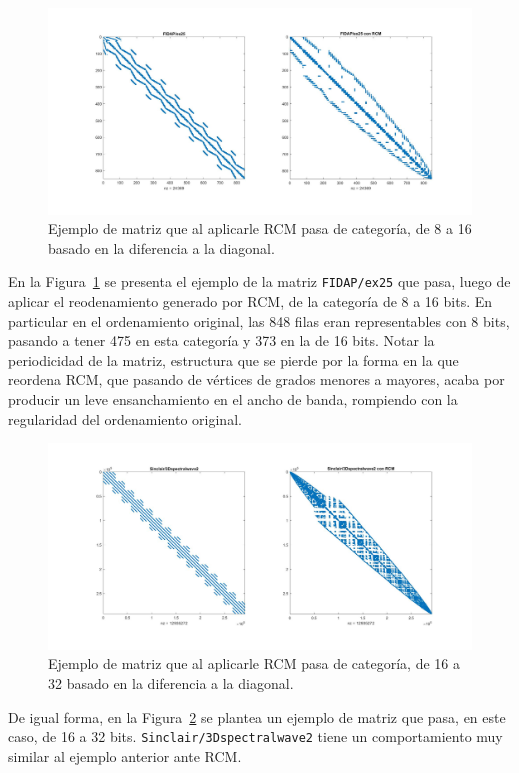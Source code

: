 \begin{figure}
    \centering
    \includegraphics[width=.7\textwidth]{imagenes/chap4/spy_diag_8_to_16.jpg}
    \caption{Ejemplo de matriz que al aplicarle RCM pasa de categoría, de 8 a 16 basado en la diferencia a la diagonal.}
    \label{fig:spy_diag_8_to_16}
\end{figure}


En la Figura~\ref{fig:spy_diag_8_to_16} se presenta el ejemplo de la matriz \texttt{FIDAP/ex25} que pasa, luego de aplicar el reodenamiento generado por RCM, de la categoría de 8 a 16 bits. En particular en el ordenamiento original, las 848 filas eran representables con 8 bits, pasando a tener 475 en esta categoría y 373 en la de 16 bits. Notar la periodicidad de la matriz, estructura que se pierde por  la forma en la que reordena RCM, que pasando de vértices de grados menores a mayores, acaba por producir un leve ensanchamiento en el ancho de banda, rompiendo con la regularidad del ordenamiento original. 



\begin{figure}
    \centering
    \includegraphics[width=.7\textwidth]{imagenes/chap4/spy_diag_16_to_32.jpg}
    \caption{Ejemplo de matriz que al aplicarle RCM pasa de categoría, de 16 a 32 basado en la diferencia a la diagonal.}
    \label{fig:spy_diag_16_to_32}
\end{figure}

De igual forma, en la Figura~\ref{fig:spy_diag_16_to_32} se plantea un ejemplo de matriz que pasa, en este caso, de 16 a 32 bits. \texttt{Sinclair/3Dspectralwave2} tiene un comportamiento muy similar al ejemplo anterior ante RCM.




